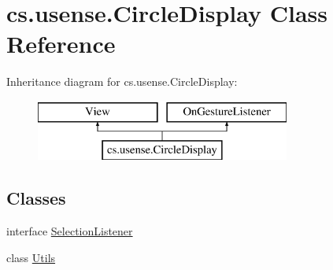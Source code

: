 \hypertarget{classcs_1_1usense_1_1_circle_display}{}\section{cs.\+usense.\+Circle\+Display Class Reference}
\label{classcs_1_1usense_1_1_circle_display}
Inheritance diagram for cs.\+usense.\+Circle\+Display\+:\begin{figure}[H]
\begin{center}
\leavevmode
\includegraphics[height=2.000000cm]{classcs_1_1usense_1_1_circle_display}
\end{center}
\end{figure}
\subsection*{Classes}
\begin{DoxyCompactItemize}
\item 
interface \hyperlink{interfacecs_1_1usense_1_1_circle_display_1_1_selection_listener}{Selection\+Listener}
\item 
class \hyperlink{classcs_1_1usense_1_1_circle_display_1_1_utils}{Utils}
\end{DoxyCompactItemize}
